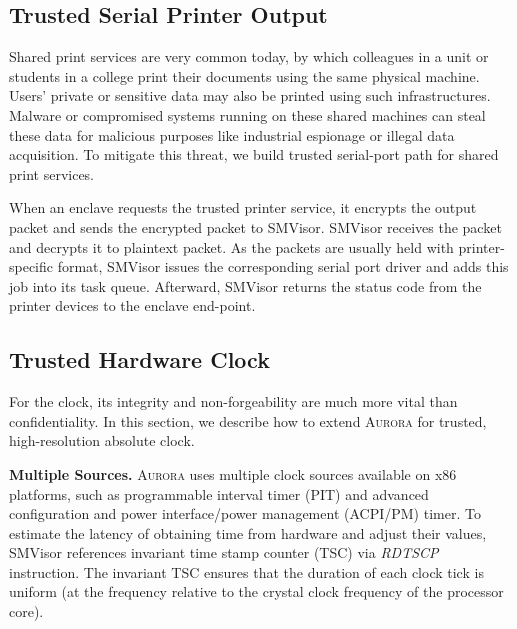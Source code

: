 \subsection{Trusted Serial Printer Output}\label{output_service}
Shared print services are very common today, by which colleagues in a unit or students in a college print their documents using the same physical machine. Users' private or sensitive data may also be printed using such infrastructures. Malware or compromised systems running on these shared machines can steal these data for malicious purposes like industrial espionage or illegal data acquisition. To mitigate this threat, we build trusted serial-port path for shared print services.

When an enclave requests the trusted printer service, it encrypts the output packet and sends the encrypted packet to SMVisor.  SMVisor receives the packet and decrypts it to plaintext packet. As the packets are usually held with printer-specific format, SMVisor issues the corresponding serial port driver and adds this job into its task queue. Afterward, SMVisor returns the status code from the printer devices to the enclave end-point.

\subsection{Trusted Hardware Clock}\label{time service}
For the clock, its integrity and non-forgeability are much more vital than confidentiality. %
In this section, we describe how to extend \textsc{Aurora} for trusted, high-resolution absolute clock. %

\textbf{Multiple Sources.}
\textsc{Aurora} uses multiple clock sources available on x86 platforms, such as programmable interval timer (PIT) and advanced configuration and power interface/power management (ACPI/PM) timer. To estimate the latency of obtaining time from hardware and adjust their values, SMVisor references invariant time stamp counter (TSC) via \textit{RDTSCP} instruction. The invariant TSC ensures that the duration of each clock tick is uniform (at the frequency relative to the crystal clock frequency of the processor core).

